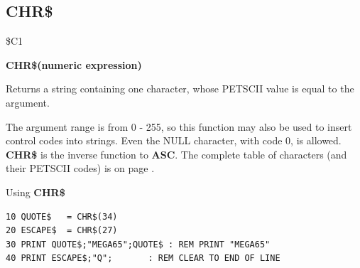 
\newpage
{}
\subsection{CHR\$}
\label{chrcommand}
\begin{description}[leftmargin=2cm,style=nextline]
\item [Token:] \$C1
\item [Format:] {\bf CHR\$(numeric expression)}
\item [Usage:] Returns a string containing one character, whose PETSCII
               value is equal to the argument.

\item [Remarks:] The argument range is from 0 - 255, so this function may
                 also be used to insert control codes into strings.
                 Even the NULL character, with code 0, is allowed. \\
                 {\bf CHR\$} is the inverse function to {\bf ASC}.
                 The complete table of characters (and their PETSCII codes) is
                 on page \pageref{appendix:asciicodes}.
\item [Example:] Using {\bf CHR\$}
\begin{tcolorbox}[colback=black,coltext=white]
\verbatimfont{\codefont}
\begin{verbatim}
10 QUOTE$   = CHR$(34)
20 ESCAPE$  = CHR$(27)
30 PRINT QUOTE$;"MEGA65";QUOTE$ : REM PRINT "MEGA65"
40 PRINT ESCAPE$;"Q";       : REM CLEAR TO END OF LINE
\end{verbatim}
\end{tcolorbox}
\end{description}


\newpage
